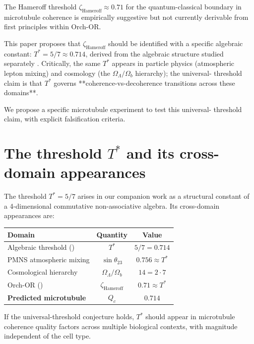 \documentclass[11pt,reqno]{amsart}
\theoremstyle{plain}
\theoremstyle{definition}
\theoremstyle{remark}
\begin{document}
The Hameroff threshold $\zeta_\text{Hameroff} \approx 0.71$ for the
quantum-classical boundary in microtubule coherence is empirically
suggestive but not currently derivable from first principles within
Orch-OR.

This paper proposes that $\zeta_\text{Hameroff}$ should be identified
with a specific algebraic constant: $T^{*} = 5/7 \approx 0.714$, derived
from the algebraic structure studied separately
\cite{Sanders2026Dirac, Sanders2026Cosmology}. Critically, the same
$T^{*}$ appears in particle physics (atmospheric lepton mixing) and
cosmology (the $\Omega_\Lambda / \Omega_b$ hierarchy); the universal-
threshold claim is that $T^{*}$ governs **coherence-vs-decoherence
transitions across these domains**.

We propose a specific microtubule experiment to test this universal-
threshold claim, with explicit falsification criteria.

\section{The threshold $T^{*}$ and its cross-domain appearances}

The threshold $T^{*} = 5/7$ arises in our companion work
\cite{Sanders2026Dirac, Sanders2026Cosmology} as a structural constant
of a 4-dimensional commutative non-associative algebra. Its
cross-domain appearances are:

\begin{center}
\begin{tabular}{lcc}
\toprule
Domain & Quantity & Value \\
\midrule
Algebraic threshold (\cite{Sanders2026Dirac}) & $T^{*}$ & $5/7 = 0.714$ \\
PMNS atmospheric mixing & $\sin\theta_{23}$ & $0.756 \approx T^{*}$ \\
Cosmological hierarchy & $\Omega_\Lambda / \Omega_b$ & $14 = 2 \cdot 7$ \\
Orch-OR (\cite{HameroffPenrose2014}) & $\zeta_\text{Hameroff}$ & $0.71 \approx T^{*}$ \\
\textbf{Predicted microtubule} & $Q_c$ & $0.714$ \\
\bottomrule
\end{tabular}
\end{center}

If the universal-threshold conjecture holds, $T^{*}$ should appear in
microtubule coherence quality factors across multiple biological
contexts, with magnitude independent of the cell type.
\end{document}
